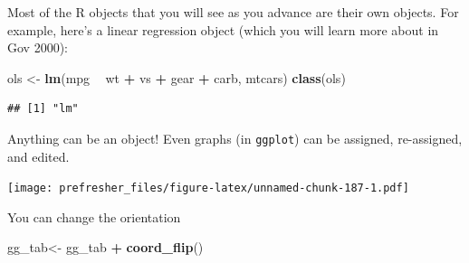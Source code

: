 \documentclass[]{book}
\newenvironment{Shaded}{\begin{snugshade}}{\end{snugshade}}
\newcommand{\KeywordTok}[1]{\textcolor[rgb]{0.13,0.29,0.53}{\textbf{#1}}}
\newcommand{\DataTypeTok}[1]{\textcolor[rgb]{0.13,0.29,0.53}{#1}}
\newcommand{\StringTok}[1]{\textcolor[rgb]{0.31,0.60,0.02}{#1}}
\newcommand{\OperatorTok}[1]{\textcolor[rgb]{0.81,0.36,0.00}{\textbf{#1}}}
\newcommand{\NormalTok}[1]{#1}
\theoremstyle{definition}
\theoremstyle{definition}
\theoremstyle{definition}
\theoremstyle{remark}
\begin{document}
Most of the R objects that you will see as you advance are their own
objects. For example, here's a linear regression object (which you will
learn more about in Gov 2000):

\begin{Shaded}
\begin{Highlighting}[]
\NormalTok{ols <-}\StringTok{ }\KeywordTok{lm}\NormalTok{(mpg }\OperatorTok{~}\StringTok{ }\NormalTok{wt }\OperatorTok{+}\StringTok{ }\NormalTok{vs }\OperatorTok{+}\StringTok{ }\NormalTok{gear }\OperatorTok{+}\StringTok{ }\NormalTok{carb, mtcars)}
\KeywordTok{class}\NormalTok{(ols)}
\end{Highlighting}
\end{Shaded}

\begin{verbatim}
## [1] "lm"
\end{verbatim}

Anything can be an object! Even graphs (in \texttt{ggplot}) can be
assigned, re-assigned, and edited.

\begin{Shaded}
\end{Shaded}

\texttt{[image: prefresher\_files/figure-latex/unnamed-chunk-187-1.pdf]}

You can change the orientation

\begin{Shaded}
\begin{Highlighting}[]
\NormalTok{gg_tab<-}\StringTok{ }\NormalTok{gg_tab }\OperatorTok{+}\StringTok{ }\KeywordTok{coord_flip}\NormalTok{()}
\end{Highlighting}
\end{Shaded}
\end{document}
